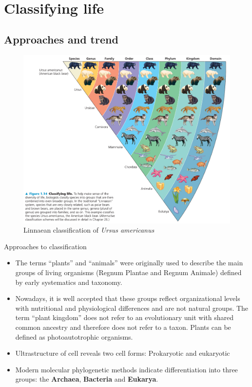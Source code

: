 \documentclass[ignorenonframetext,aspectratio=169]{beamer}
\providecommand{\tightlist}{%
  \setlength{\itemsep}{0pt}\setlength{\parskip}{0pt}}
\begin{document}
\hypertarget{classifying-life}{%
\section{Classifying life}\label{classifying-life}}

\hypertarget{approaches-and-trend}{%
\subsection{Approaches and trend}\label{approaches-and-trend}}

\begin{frame}{}
\protect\hypertarget{section-1}{}

\begin{figure}
\includegraphics[width=0.55\linewidth]{./../images/classification_ursus} \caption{Linnaean classification of \textit{Ursus americanus}}\label{fig:classifying-life}
\end{figure}

\end{frame}

\begin{frame}{Approaches to classification}
\protect\hypertarget{approaches-to-classification}{}

\begin{itemize}
\tightlist
\item
  The terms ``plants'' and ``animals'' were originally used to describe
  the main groups of living organisms (Regnum Plantae and Regnum
  Animale) defined by early systematics and taxonomy.
\item
  Nowadays, it is well accepted that these groups reflect organizational
  levels with nutritional and physiological differences and are not
  natural groups. The term ``plant kingdom'' does not refer to an
  evolutionary unit with shared common ancestry and therefore does not
  refer to a taxon. Plants can be defined as photoautotrophic organisms.
\item
  Ultrastructure of cell reveals two cell forms: Prokaryotic and
  eukaryotic
\item
  Modern molecular phylogenetic methods indicate differentiation into
  three groups: the \textbf{Archaea}, \textbf{Bacteria} and
  \textbf{Eukarya}.
\end{itemize}

\end{frame}
\end{document}
